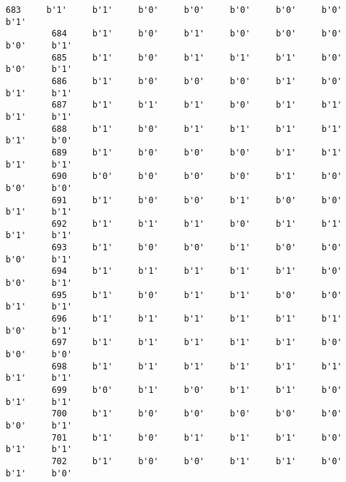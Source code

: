\documentclass[11pt]{article}
\begin{document}
\begin{Verbatim}[commandchars=\\\{\}]
         683     b'1'     b'1'     b'0'     b'0'     b'0'     b'0'     b'0'     b'1'   
         684     b'1'     b'0'     b'1'     b'0'     b'0'     b'0'     b'0'     b'1'   
         685     b'1'     b'0'     b'1'     b'1'     b'1'     b'0'     b'0'     b'1'   
         686     b'1'     b'0'     b'0'     b'0'     b'1'     b'0'     b'1'     b'1'   
         687     b'1'     b'1'     b'1'     b'0'     b'1'     b'1'     b'1'     b'1'   
         688     b'1'     b'0'     b'1'     b'1'     b'1'     b'1'     b'1'     b'0'   
         689     b'1'     b'0'     b'0'     b'0'     b'1'     b'1'     b'1'     b'1'   
         690     b'0'     b'0'     b'0'     b'0'     b'1'     b'0'     b'0'     b'0'   
         691     b'1'     b'0'     b'0'     b'1'     b'0'     b'0'     b'1'     b'1'   
         692     b'1'     b'1'     b'1'     b'0'     b'1'     b'1'     b'1'     b'1'   
         693     b'1'     b'0'     b'0'     b'1'     b'0'     b'0'     b'0'     b'1'   
         694     b'1'     b'1'     b'1'     b'1'     b'1'     b'0'     b'0'     b'1'   
         695     b'1'     b'0'     b'1'     b'1'     b'0'     b'0'     b'1'     b'1'   
         696     b'1'     b'1'     b'1'     b'1'     b'1'     b'1'     b'0'     b'1'   
         697     b'1'     b'1'     b'1'     b'1'     b'1'     b'0'     b'0'     b'0'   
         698     b'1'     b'1'     b'1'     b'1'     b'1'     b'1'     b'1'     b'1'   
         699     b'0'     b'1'     b'0'     b'1'     b'1'     b'0'     b'1'     b'1'   
         700     b'1'     b'0'     b'0'     b'0'     b'0'     b'0'     b'0'     b'1'   
         701     b'1'     b'0'     b'1'     b'1'     b'1'     b'0'     b'1'     b'1'   
         702     b'1'     b'0'     b'0'     b'1'     b'1'     b'0'     b'1'     b'0'   
         

\end{Verbatim}
\end{document}
